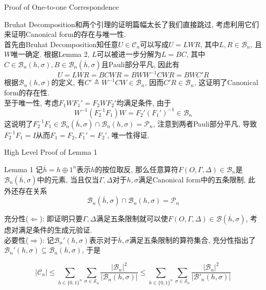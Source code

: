 \documentclass{beamer}
\begin{document}
\begin{frame}{Proof of One-to-one Correspondence}
	
	{\color{gray} {\tiny Bruhat Decomposition和两个引理的证明篇幅太长了我们直接跳过,}} 考虑利用它们来证明Canonical form的存在与唯一性.\pause\\
	
	首先由Bruhat Decomposition知任意$U \in \mathcal C_n$可以写成$U = LWR$, 其中$L, R \in \mathcal B_n$, 且$W$唯一确定. 根据Lemma 2, $L$可以被进一步分解为$L = BC$, 其中$C \in \mathcal B_{n}(h, \sigma), B \in \mathcal B_n(\overline h, \sigma)$且Pauli部分平凡, 因此有
	$$U = LWR = BCWR = BWW^{-1}CWR = BWC'R$$
	根据$\mathcal B_n(h, \sigma)$的定义, 有$C' \triangleq W^{-1}CW \in \mathcal B_n$, 因而$C'R \in \mathcal B_n$, 这证明了Canonical form的存在性.\pause\\
	
	至于唯一性, 考虑$F_1WF_1' = F_2WF_2'$均满足条件, 由于
	$$W^{-1}(F_2^{-1}F_1)W = F_2'(F_1')^{-1} \in \mathcal B_n$$
	这说明了$F_2^{-1}F_1 \in \mathcal B_n(\overline{h}, \sigma) \cap \mathcal B_n(h, \sigma) = \mathcal P_n$, 注意到两者Pauli部分平凡, 导致$F_2^{-1}F_1 = I$从而$F_1 = F_2, F_1' = F_2'$, 唯一性得证.
	
\end{frame}
\begin{frame}{High Level Proof of Lemma 1}
	\begin{block}{Lemma 1}
		记$\overline{h} = h \oplus 1^n$表示$h$的按位取反, 那么任意算符$F(O, \Gamma, \Delta) \in \mathcal B_n$是$\mathcal B_n(\overline{h}, \sigma)$中的元素, 当且仅当$\Gamma, \Delta$对于$h, \sigma$满足Canonical form中的五条限制, 此外还存在关系$$
		\mathcal B_n(\overline{h}, \sigma) \cap \mathcal B_n(h, \sigma) = \mathcal P_n$$
	\end{block}\pause
	
	充分性($\Leftarrow$): 即证明只要$\Gamma, \Delta$满足五条限制就可以使$F(O, \Gamma, \Delta) \in \mathcal B(\overline h, \sigma)$, 考虑对满足条件的生成元验证.\pause\\
	
	必要性($\Rightarrow$): 记$\mathcal B_n'(h, \sigma)$表示对于$\overline h, \sigma$满足五条限制的算符集合, 充分性指出了$\mathcal B_n'(h, \sigma) \subseteq \mathcal B_n(h, \sigma)$, 于是
	
	$$|\mathcal C_n| \le \sum_{h \in \{0, 1\}^n} \sum_{\sigma \in \mathcal S_n} \frac{|\mathcal B_n|^2}{|\mathcal B_n(h, \sigma)|} \le \sum_{h \in \{0, 1\}^n} \sum_{\sigma \in \mathcal S_n} \frac{|\mathcal B_n|^2}{|\mathcal B'_n(h, \sigma)|}$$
\end{frame}
\end{document}
